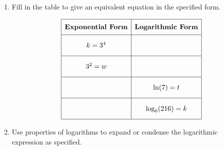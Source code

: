 \documentclass[11pt]{article}
\begin{document}
\begin{enumerate}

% 

\item %
\providecommand{\stxKnowl}{}\renewcommand{\stxKnowl}[1]{#1}
\providecommand{\stxOuttro}{}\renewcommand{\stxOuttro}[1]{#1}
\providecommand{\stxTitle}{}\renewcommand{\stxTitle}[1]{#1}
\renewcommand{\stxOuttro}[1]{}
\stxKnowl{
Fill in the table to give an equivalent equation in the specified form.

 \[\begin{array}{|c|c|} \hline \rule[-0.8em]{0pt}{2.2em} \textbf{Exponential Form} & \textbf{Logarithmic Form} \\ \hline \rule[-1.2em]{0pt}{3em} k = 3^{4} & \hspace{3cm} \\ \hline \rule[-1.2em]{0pt}{3em} 3^{2} = w & \hspace{3cm} \\ \hline \rule[-1.2em]{0pt}{3em} \hspace{3cm} & \ln(7) = t \\ \hline \rule[-1.2em]{0pt}{3em} \hspace{3cm} & \log_{6}(216) = k \\ \hline \end{array}\] 

\stxOuttro{
Solution

 \[\begin{array}{|c|c|} \hline \rule[-0.8em]{0pt}{2.2em} \textbf{Exponential Form} & \textbf{Logarithmic Form} \\ \hline \rule[-1.2em]{0pt}{3em} k = 3^{4} & \log_{3}(k) = 4 \\ \hline \rule[-1.2em]{0pt}{3em} 3^{2} = w & \log_{3}(w) = 2 \\ \hline \rule[-1.2em]{0pt}{3em} e^{t} = 7 & \ln(7) = t \\ \hline \rule[-1.2em]{0pt}{3em} 6^{k} = 216 & \log_{6}(216) = k \\ \hline \end{array}\] 

}
}

\newpage

% 

\item %
\providecommand{\stxKnowl}{}\renewcommand{\stxKnowl}[1]{#1}
\providecommand{\stxOuttro}{}\renewcommand{\stxOuttro}[1]{#1}
\providecommand{\stxTitle}{}\renewcommand{\stxTitle}[1]{#1}
\renewcommand{\stxOuttro}[1]{}
\stxKnowl{
Use properties of logarithms to expand or condense the logarithmic expression as specified.

}
\end{enumerate}
\end{document}
